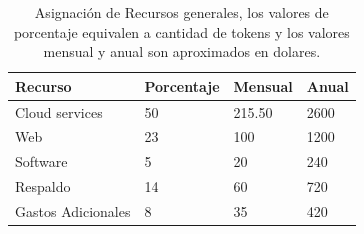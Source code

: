 \documentclass[12pt,a4paper,openright]{article}
\begin{document}
\begin{table}[h!]
\begin{adjustbox}{width=\textwidth}
\begin{tabular}{|l|l|l|l|}
\hline
\textbf{Recurso}   & \textbf{Porcentaje} & \textbf{Mensual} & \textbf{Anual} \\ \hline
Cloud services     & 50                  & 215.50           & 2600           \\ \hline
Web                & 23                  & 100              & 1200           \\ \hline
Software           & 5                   & 20               & 240            \\ \hline
Respaldo           & 14                  & 60               & 720            \\ \hline
Gastos Adicionales & 8                   & 35               & 420            \\ \hline
\end{tabular}
\end{adjustbox}
\caption{Asignaci\'on de Recursos generales, los valores de porcentaje equivalen a cantidad de tokens y los valores mensual y anual son aproximados en dolares.}
\end{table}
\end{document}

